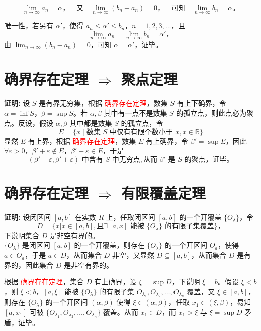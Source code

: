 \documentclass[lang=cn,newtx,10pt,scheme=chinese]{elegantbook}
\begin{document}
\[
\lim_{n \to \infty} a_n = \alpha， \quad \text{又} \quad \lim_{n \to \infty} (b_n - a_n) = 0， \quad \text{可知} \quad \lim_{n \to \infty} b_n = \alpha。
\]

唯一性，若另有 $\alpha'$，使得 $a_n \leq \alpha' \leq b_n，n = 1, 2, 3, \ldots$，且
\[
\lim_{n \to \infty} a_n = \lim_{n \to \infty} b_n = \alpha'，
\]
由 $\lim_{n \to \infty} (b_n - a_n) = 0$，可知 $\alpha = \alpha'$，证毕。

\section*{确界存在定理 $\Rightarrow$ 聚点定理}

\textbf{证明:} 设 $S$ 是有界无穷集，根据 \textcolor{red}{确界存在定理}，数集 $S$ 有上下确界，令 $\alpha = \inf S$，$\beta = \sup S$。若 $\alpha, \beta$ 其中有一点不是数集 $S$ 的孤立点，则此点必为聚点。反设，假设 $\alpha, \beta$ 其中都是数集 $S$ 的孤立点，令
\[
E = \{x \mid \text{数集 } S \text{ 中仅有有限个数小于 } x, x \in \mathbb{R}\}
\]
显然 $E$ 有上界，根据 \textcolor{red}{确界存在定理}，数集 $E$ 有上确界，令 $\beta' = \sup E$，因此 $\forall \varepsilon > 0$，$\beta' + \varepsilon \notin E$，$\beta' - \varepsilon \in E$，于是
\[
(\beta' - \varepsilon, \beta' + \varepsilon) \text{ 中含有 } S \text{ 中无穷点}, \text{从而 } \beta' \text{ 是 } S \text{ 的聚点，证毕}。
\]

\section*{确界存在定理 $\Rightarrow$ 有限覆盖定理}

\textbf{证明:} 设闭区间 $[a, b]$ 在实数 $R$ 上，任取闭区间 $[a, b]$ 的一个开覆盖 $\{O_{\lambda}\}$，令
\[
D = \{x | x \in [a, b], 且 \exists [a, x] \text{ 能被 } \{O_{\lambda}\} \text{ 的有限子集覆盖}\}，
\]
下说明集合 $D$ 是非空有界的。\\
$\{O_{\lambda}\}$ 是闭区间 $[a, b]$ 的一个开覆盖，则存在 $\{O_{\lambda}\}$ 的一个开区间 $O_a$，使得 $a \in O_a$，于是 $a \in D$，从而集合 $D$ 非空，又显然 $D \subseteq [a, b]$，从而集合 $D$ 是有界的，因此集合 $D$ 是非空有界的。

根据 \textcolor{red}{确界存在定理}，集合 $D$ 有上确界，设 $\xi = \sup D$，下说明 $\xi = b$。假设 $\xi < b$，则 $\xi < b$，$[a, \xi]$ 能被 $\{O_{\lambda}\}$ 的有限子集 $O_{\lambda_1}, O_{\lambda_2}, \ldots, O_{\lambda_n}$ 覆盖，又 $\xi \in [a, b]$，则存在 $\{O_{\lambda}\}$ 的一个开区间 $(\alpha, \beta)$ 使得 $\xi \in (\alpha, \beta)$，任取 $x_1 \in (\xi, \beta)$，易知 $[a, x_1]$ 可被 $\{O_{\lambda_1}, O_{\lambda_2}, \ldots, O_{\lambda_n}\}$ 覆盖。从而 $x_1 \in D$，而 $x_1 > \xi$ 与 $\xi = \sup D$ 矛盾，证毕。
\end{document}
